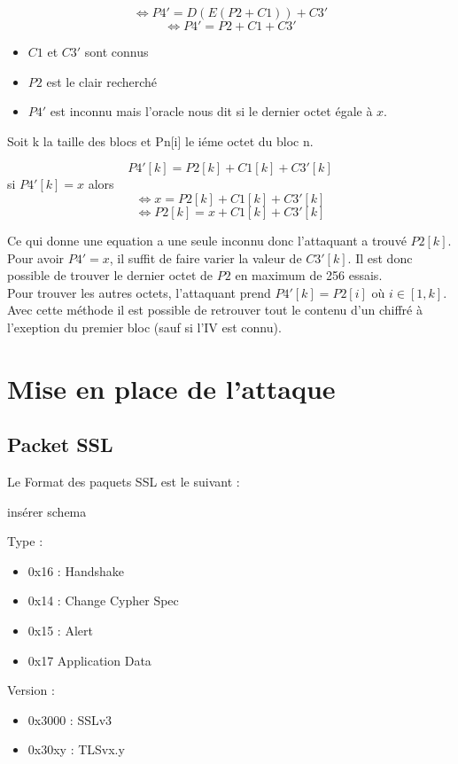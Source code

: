 \[\Longleftrightarrow P4' = D(E(P2 + C1)) + C3'\]
\[\Longleftrightarrow P4' = P2 + C1 + C3'\]
\begin{itemize}
\item $C1$ et $C3'$ sont connus
\item $P2$ est le clair recherché
\item $P4'$ est inconnu mais l'oracle nous dit si le dernier octet égale à $x$.
\end{itemize}
Soit k la taille des blocs et Pn[i] le iéme octet du bloc n.

\[P4'[k] = P2[k] + C1[k] + C3'[k]\] si $P4'[k] = x$ alors
\[\Longleftrightarrow x = P2[k] + C1[k] + C3'[k]\]
\[\Longleftrightarrow P2[k] = x + C1[k] + C3'[k]\]

Ce qui donne une equation a une seule inconnu donc l'attaquant a trouvé $P2[k]$.
Pour avoir $P4' = x$, il suffit de faire varier la valeur de $C3'[k]$. Il est donc
possible de trouver le dernier octet de $P2$ en maximum de 256 essais.\\

Pour trouver les autres octets, l'attaquant prend $P4'[k] = P2[i]$ où $i \in [1,k]$.
Avec cette méthode il est possible de retrouver tout le contenu d'un chiffré à
l'exeption du premier bloc (sauf si l'IV est connu).

\chapter{Mise en place de l'attaque}
\label{chapter:Poodleattack}

\section{Packet SSL}

Le Format des paquets SSL est le suivant : 

insérer schema

Type :
\begin{itemize}
\item 0x16 : Handshake
\item 0x14 : Change Cypher Spec
\item 0x15 : Alert
\item 0x17 Application Data
\end{itemize}

Version :
\begin{itemize}
\item 0x3000 : SSLv3
\item 0x30xy : TLSvx.y
\end{itemize}



